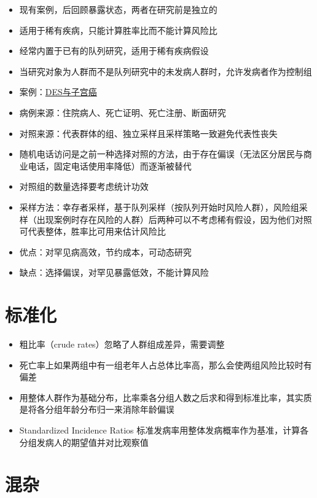 \documentclass[]{book}
\providecommand{\tightlist}{%
  \setlength{\itemsep}{0pt}\setlength{\parskip}{0pt}}
\begin{document}
\begin{itemize}
\tightlist
\item
  现有案例，后回顾暴露状态，两者在研究前是独立的
\item
  适用于稀有疾病，只能计算胜率比而不能计算风险比
\item
  经常内置于已有的队列研究，适用于稀有疾病假设
\item
  当研究对象为人群而不是队列研究中的未发病人群时，允许发病者作为控制组
\item
  案例：\href{http://www.cancer.gov/about-cancer/causes-prevention/risk/hormones/des-fact-sheet}{DES与子宫癌}
\item
  病例来源：住院病人、死亡证明、死亡注册、断面研究
\item
  对照来源：代表群体的组、独立采样且采样策略一致避免代表性丧失
\item
  随机电话访问是之前一种选择对照的方法，由于存在偏误（无法区分居民与商业电话，固定电话使用率降低）而逐渐被替代
\item
  对照组的数量选择要考虑统计功效
\item
  采样方法：幸存者采样，基于队列采样（按队列开始时风险人群），风险组采样（出现案例时存在风险的人群）后两种可以不考虑稀有假设，因为他们对照可代表整体，胜率比可用来估计风险比
\item
  优点：对罕见病高效，节约成本，可动态研究
\item
  缺点：选择偏误，对罕见暴露低效，不能计算风险
\end{itemize}

\hypertarget{ux6807ux51c6ux5316}{%
\section{标准化}\label{ux6807ux51c6ux5316}}

\begin{itemize}
\tightlist
\item
  粗比率（crude rates）忽略了人群组成差异，需要调整
\item
  死亡率上如果两组中有一组老年人占总体比率高，那么会使两组风险比较时有偏差
\item
  用整体人群作为基础分布，比率乘各分组人数之后求和得到标准比率，其实质是将各分组年龄分布归一来消除年龄偏误
\item
  Standardized Incidence Ratios 标准发病率用整体发病概率作为基准，计算各分组发病人的期望值并对比观察值
\end{itemize}

\hypertarget{ux6df7ux6742}{%
\section{混杂}\label{ux6df7ux6742}}
\end{document}
